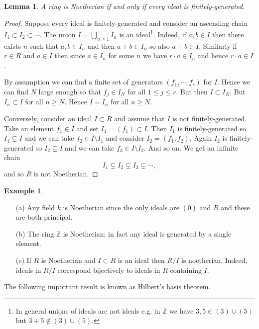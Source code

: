 \documentclass [12pt,oneside,a4paper,mathscr]{amsart}
\newtheorem{lemma}[thm]{Lemma}
\theoremstyle{definition}
\newtheorem{example}[thm]{Example}
\renewcommand{\leq}{\leqslant}
\renewcommand{\geq}{\geqslant}
\newcommand{\Z}{\mathbb Z}
\begin{document}
\begin{lemma}
A ring is Noetherian if and only if every ideal is finitely-generated.
\end{lemma}

\begin{proof}
Suppose every ideal is finitely-generated and consider an ascending chain $I_1\subset I_2\subset \cdots $. The union $I=\bigcup_{n\geq 1} I_n$ is an ideal\footnote{In general unions of ideals are not ideals e.g. in $\Z$ we have $3,5\in (3)\cup(5)$ but $3+5\notin (3)\cup (5)$. }. Indeed,  if $a,b\in I$ then there exists $n$ such that $a,b\in I_n$ and then $a+b\in I_n$ so also $a+b\in I$. Similarly if $r\in R$ and $a\in I$ then since $a\in I_n$ for some $n$ we have  $r\cdot a\in I_n$  and hence $r\cdot a\in I$.

 By assumption we can find a finite set of generators $(f_1,\cdots, f_r)$ for $I$. Hence we can find $N$ large enough so that $f_j\in I_N$ for all $1\leq j\leq r$. But then $I\subset I_N$. But $I_n\subset I$ for all $n\geq N$. Hence $I=I_n$ for all $n\geq N$.

Conversely, consider an ideal $I\subset R$ and assume that $I$ is not finitely-generated. Take an element $f_1\in I$ and set $I_1=(f_1)\subset I$. Then $I_1$ is finitely-generated so $I_1\subsetneq I$ and we can take $f_2\in I\setminus I_1$ and consider $I_2=(f_1,f_2)$. Again $I_2$ is finitely-generated so $I_2\subsetneq I$ and we can  take $f_3\in I\setminus I_2$. And so on. We get an infinite chain
\[I_1\subsetneq I_2 \subsetneq I_3 \subsetneq \cdots,\]
and so $R$ is not Noetherian.
\end{proof}

\begin{example}
\label{egg}
\begin{itemize}
\item[(a)] Any field $k$ is Noetherian since the only ideals are $(0)$ and $R$  and these are both principal.
\smallskip
\item[(b)] The ring $\Z$ is Noetherian; in fact any ideal is generated by a single element.
\smallskip

\item[(c)] 
If $R$ is Noetherian and $I\subset R$ is an ideal then $R/I$ is noetherian. Indeed, ideals in $R/I$ correspond bijectively to ideals in $R$ containing $I$.
\end{itemize}
\end{example}

The following important result is known as Hilbert's basis theorem.
\end{document}
